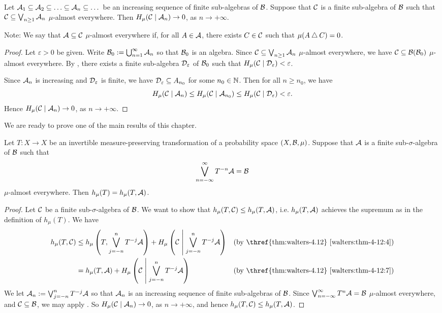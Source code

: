 \begin{corollary} \label{cor:walters-4-16-1}
	Let $\A_1 \subset \A_2 \subset \dots \subset \A_n \subset \dots$ be an increasing sequence of finite sub-algebras of $\mathcal{B}$. Suppose that $\mathcal{C}$ is a finite sub-algebra of $\mathcal{B}$ such that $\mathcal{C} \subseteq \bigvee_{n \geq 1}{\mathcal{A}_n}$ $\mu$-almost everywhere. Then $H_\mu(\mathcal{C} \mid \mathcal{A}_n) \to 0$, as $n \to +\infty$.
	
	Note: We say that $\mathcal{A} \subseteq \mathcal{C}$ $\mu$-almost everywhere if, for all $A \in \mathcal{A}$, there exists $C \in \mathcal{C}$ such that $\mu(A \bigtriangleup C) = 0$.
	
	\begin{proof}
		Let $\varepsilon > 0$ be given. Write $\mathcal{B}_0 := \bigcup_{n = 1}^\infty{\mathcal{A}_n}$ so that $\mathcal{B}_0$ is an algebra. Since $\mathcal{C} \subseteq \bigvee_{n \geq 1}{\mathcal{A}_n}$ $\mu$-almost everywhere, we have $\mathcal{C} \subseteq \mathcal{B}(\mathcal{B}_0)$ $\mu$-almost everywhere. By , there exists a finite sub-algebra $\mathcal{D}_\varepsilon$ of $\mathcal{B}_0$ such that $H_\mu(\mathcal{C} \mid \mathcal{D}_\varepsilon) < \varepsilon$.
		
		Since $\mathcal{A}_n$ is increasing and $\mathcal{D}_\varepsilon$ is finite, we have $\mathcal{D}_\varepsilon \subseteq A_{n_0}$ for some $n_0 \in \mathbb{N}$. Then for all $n \geq n_0$, we have
		\[
			H_\mu(\mathcal{C} \mid \mathcal{A}_n) \leq H_\mu(\mathcal{C} \mid \mathcal{A}_{n_0}) \leq H_\mu(\mathcal{C} \mid \mathcal{D}_\varepsilon) < \varepsilon.
		\]
		Hence $H_\mu(\mathcal{C} \mid \mathcal{A}_n) \to 0$, as $n \to +\infty$.
	\end{proof}
\end{corollary}

We are ready to prove one of the main results of this chapter.

\begin{theorem} \label{thm:kolmogorov-sinai}
	Let $T : X \to X$ be an invertible measure-preserving transformation of a probability space $(X, \mathcal{B}, \mu)$. Suppose that $\mathcal{A}$ is a finite sub-$\sigma$-algebra of $\mathcal{B}$ such that
	\[
		\bigvee_{n = -\infty}^\infty{T^{-n}{\mathcal{A}}} = \mathcal{B}
	\]
	$\mu$-almost everywhere. Then $h_\mu(T) = h_\mu(T, \mathcal{A})$.
	
	\begin{proof}
		Let $\mathcal{C}$ be a finite sub-$\sigma$-algebra of $\mathcal{B}$. We want to show that $h_\mu(T, \mathcal{C}) \leq h_\mu(T, \mathcal{A})$, i.e. $h_\mu(T, \mathcal{A})$ achieves the supremum as in the definition of $h_\mu(T)$. We have
		\begin{align*}
			h_\mu(T, \C) &\leq h_\mu\left(T, \bigjoin_{j = -n}^n{T^{-j}{\A}}\right) + H_\mu\left(\C \midmid \bigjoin_{j = -n}^n{T^{-j}{\A}}\right) & \text{(by \thref{thm:walters-4.12} \ref{walters:thm-4-12:4})} \\
				&= h_\mu(T, \A) + H_\mu\left(\C \midmid \bigjoin_{j = -n}^n{T^{-j}{\A}} \right) & \text{(by \thref{thm:walters-4.12} \ref{walters:thm-4-12:7})}
		\end{align*}
		We let $\mathcal{A}_n := \bigvee_{j = -n}^n{T^{-j}{\mathcal{A}}}$ so that $\mathcal{A}_n$ is an increasing sequence of finite sub-algebras of $\mathcal{B}$. Since $\bigvee_{n = -\infty}^\infty{T^n{\mathcal{A}}} = \mathcal{B}$ $\mu$-almost everywhere, and $\mathcal{C} \subseteq \mathcal{B}$, we may apply . So $H_\mu(\mathcal{C} \mid \mathcal{A}_n) \to 0$, as $n \to +\infty$, and hence $h_\mu(T, \mathcal{C}) \leq h_\mu(T, \mathcal{A})$.
	\end{proof}
\end{theorem}

